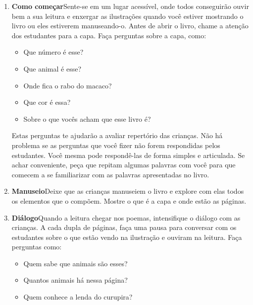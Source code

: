 \documentclass[11pt]{extarticle}
\begin{document}
\begin{enumerate}
\item \textbf{Como começar}\quad Sente-se em um lugar acessível, 
onde todos conseguirão ouvir bem a sua leitura e enxergar as ilustrações 
quando você estiver mostrando o livro ou eles estiverem manuseando-o. 
Antes de abrir o livro, chame a atenção dos estudantes para a capa. 
Faça perguntas sobre a capa, como: 

\begin{itemize}
\item Que número é esse?
\item Que animal é esse?
\item Onde fica o rabo do macaco?
\item Que cor é essa?
\item Sobre o que vocês acham que esse livro é?
\end{itemize}

Estas perguntas te ajudarão a avaliar repertório das crianças. 
Não há problema se as perguntas que você fizer não forem respondidas pelos 
estudantes. Você mesma pode respondê-las de forma simples e articulada. Se achar 
conveniente, peça que repitam algumas palavras com você para que comecem a se familiarizar com as palavras apresentadas no livro. 
 


\item \textbf{Manuseio}\quad Deixe que as crianças manuseiem o livro 
e explore com elas todos os elementos que o compõem. Mostre o que é a 
capa e onde estão as páginas.

\item \textbf{Diálogo}\quad Quando a leitura chegar nos poemas, 
intensifique o diálogo com as crianças. A cada dupla de páginas, faça uma 
pausa para conversar com os estudantes sobre o que estão vendo na ilustração e ouviram na leitura. 
Faça perguntas como: 

\begin{itemize}
\item Quem sabe que animais são esses?
\item Quantos animais há nessa página?
\item Quem conhece a lenda do curupira?
\end{itemize}


\end{enumerate}
\end{document}
